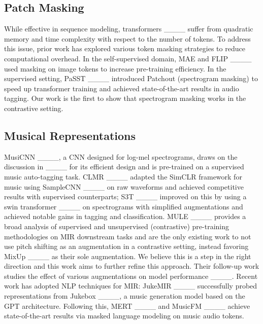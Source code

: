 \subsection{Patch Masking}
While effective in sequence modeling, transformers ____ suffer from quadratic memory and time complexity with respect to the number of tokens. To address this issue, prior work has explored various token masking strategies to reduce computational overhead. In the self-supervised domain, MAE and FLIP ____ used masking on image tokens to increase pre-training efficiency. In the supervised setting, PaSST ____ introduced Patchout (spectrogram masking) to speed up transformer training and achieved state-of-the-art results in audio tagging. Our work is the first to show that spectrogram masking works in the contrastive setting. 

\subsection{Musical Representations}

MusiCNN ____, a CNN designed for log-mel spectrograms, draws on the discussion in ____ for its efficient design and is pre-trained on a supervised music auto-tagging task. CLMR ____ adapted the SimCLR framework for music using SampleCNN ____ on raw waveforms and achieved competitive results with supervised counterparts; S3T ____ improved on this by using a swin transformer ____ on spectrograms with simplified augmentations and achieved notable gains in tagging and classification. MULE ____ provides a broad analysis of supervised and unsupervised (contrastive) pre-training methodologies on MIR downstream tasks and are the only existing work to not use pitch shifting as an augmentation in a contrastive setting, instead favoring MixUp ____ as their sole augmentation. We believe this is a step in the right direction and this work aims to further refine this approach. Their follow-up work studies the effect of various augmentations on model performance ____. Recent work has adopted NLP techniques for MIR: JukeMIR ____ successfully probed representations from Jukebox ____, a music generation model based on the GPT architecture. Following this, MERT ____ and MusicFM ____ achieve state-of-the-art results via masked language modeling on music audio tokens.